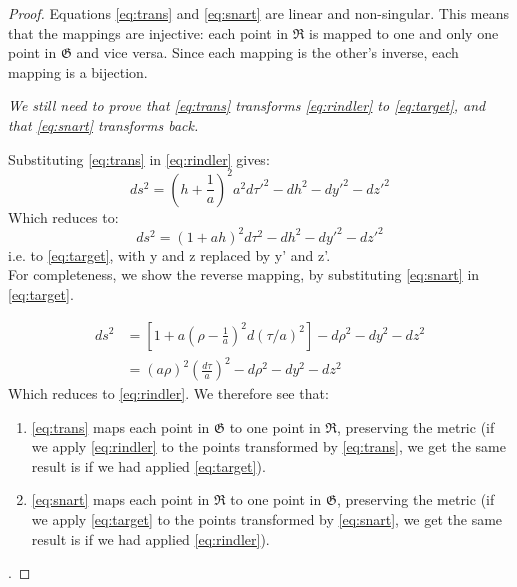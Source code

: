 \documentclass[11pt,a4paper]{article}
\begin{document}
\begin{proof}
Equations \eqref{eq:trans} and \eqref{eq:snart} are linear and non-singular. This means that the mappings are injective: each point in  $\mathfrak{R}$ is mapped to one and only one point in  $\mathfrak{G}$ and vice versa. Since each mapping is the other's inverse, each mapping is a bijection.

\textit{We still need to prove that \eqref{eq:trans} transforms \eqref{eq:rindler} to \eqref{eq:target}, and that \eqref{eq:snart} transforms back.}

Substituting \eqref{eq:trans} in \eqref{eq:rindler} gives:
\begin{equation*}
ds^{2}=(h+\frac{1}{a})^{2}a^{2}d\tau'^{2}-dh^{2}-dy'^{2}-dz'^{2}
\end{equation*}
Which reduces to:
\begin{equation*}
ds^{2}=(1+ah)^{2}d\tau^{2}-dh^{2}-dy'^{2}-dz'^{2} 
\end{equation*}
i.e. to \eqref{eq:target}, with y and z replaced by y' and z'.\\[12pt]
For completeness, we show the reverse mapping, by substituting \eqref{eq:snart} in \eqref{eq:target}.

\begin{align*}
ds^{2}&=[1+a(\rho-\frac{1}{a})^{2}d(\tau/a)^{2}]-d\rho^{2}-dy^{2}-dz^{2}\\
&=(a\rho)^{2}(\frac{d\tau}{a})^{2}-d\rho^{2}-dy^{2}-dz^{2}
\end{align*}
Which reduces to \eqref{eq:rindler}. We therefore see that:
\begin{enumerate}
	\item \eqref{eq:trans} maps each point in $\mathfrak{G}$ to one point in $\mathfrak{R}$, preserving the metric (if we apply \eqref{eq:rindler} to the points transformed by \eqref{eq:trans}, we get the same result is if we had applied \eqref{eq:target}).
	\item \eqref{eq:snart} maps each point in $\mathfrak{R}$ to one point in $\mathfrak{G}$, preserving the metric (if we apply \eqref{eq:target} to the points transformed by \eqref{eq:snart}, we get the same result is if we had applied \eqref{eq:rindler}).
\end{enumerate}.
\end{proof}
\end{document}
